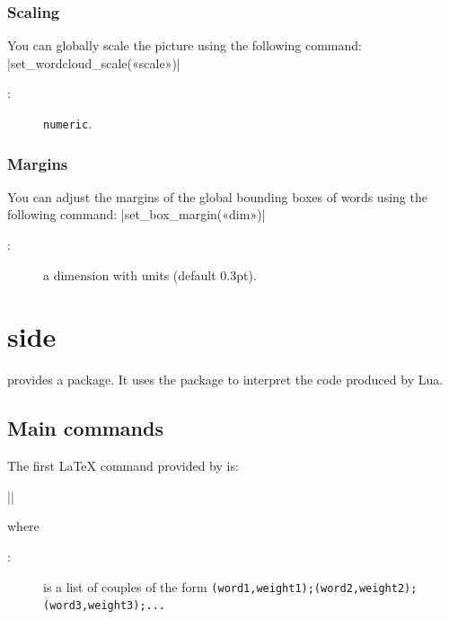 \documentclass[english]{ltxdoc}
\begin{document}
\subsubsection{Scaling}

You can globally scale the picture using the following command:
\commande|set_wordcloud_scale(«scale»)|\smallskip{}

\begin{description}
  \item[:] \lstinline+numeric+. 
\end{description}

\subsubsection{Margins}

You can adjust the margins of the global bounding boxes of words using the
following command:
\commande|set_box_margin(«dim»)|\smallskip{}

\begin{description}
  \item[:] a dimension with units (default 0.3pt). 
\end{description}



\section{ side}

 provides a  package. It uses the package
 to interpret the  code produced by Lua. 


\subsection{Main commands}

The first \LaTeX{} command provided by \wordcloudpkg is:

\commande||\smallskip\index{\wordcloud@\lstinline+\wordcloud+}

where
\begin{description}
  \item[:] is a list of couples of the form
  \lstinline+(word1,weight1);(word2,weight2);(word3,weight3);...+
\end{description}
\end{document}

